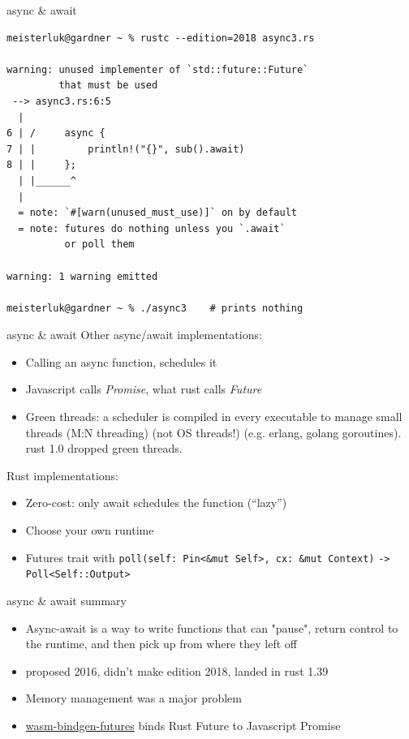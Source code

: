 \documentclass{beamer}
\begin{document}
\begin{frame}[fragile]{async \& await}
  \begin{verbatim}
meisterluk@gardner ~ % rustc --edition=2018 async3.rs

warning: unused implementer of `std::future::Future`
         that must be used
 --> async3.rs:6:5
  |
6 | /     async {
7 | |         println!("{}", sub().await)
8 | |     };
  | |______^
  |
  = note: `#[warn(unused_must_use)]` on by default
  = note: futures do nothing unless you `.await`
          or poll them

warning: 1 warning emitted

meisterluk@gardner ~ % ./async3    # prints nothing
  \end{verbatim}
\end{frame}

\begin{frame}[fragile]{async \& await}
  Other async/await implementations:
  \begin{itemize}
    \item Calling an async function, schedules it
    \item Javascript calls \emph{Promise}, what rust calls \emph{Future}
    \item Green threads: a scheduler is compiled in every executable to manage small threads (M:N threading) (not OS threads!) (e.g. erlang, golang goroutines). rust 1.0 dropped green threads.
  \end{itemize}
  Rust implementations:
  \begin{itemize}
    \item Zero-cost: only await schedules the function (\enquote{lazy})
    \item Choose your own runtime
    \item Futures trait with \texttt{poll(self: Pin<&mut Self>, cx: &mut Context)} \texttt{-> Poll<Self::Output>}
  \end{itemize}
\end{frame}

\begin{frame}[fragile]{async \& await summary}
  \begin{itemize}
    \item Async-await is a way to write functions that can "pause", return control to the runtime, and then pick up from where they left off
    \item proposed 2016, didn't make edition 2018, landed in rust 1.39
    \item Memory management was a major problem
    \item \href{https://docs.rs/crate/wasm-bindgen-futures/0.4.17}{wasm-bindgen-futures} binds Rust Future to Javascript Promise
  \end{itemize}
\end{frame}
\end{document}

